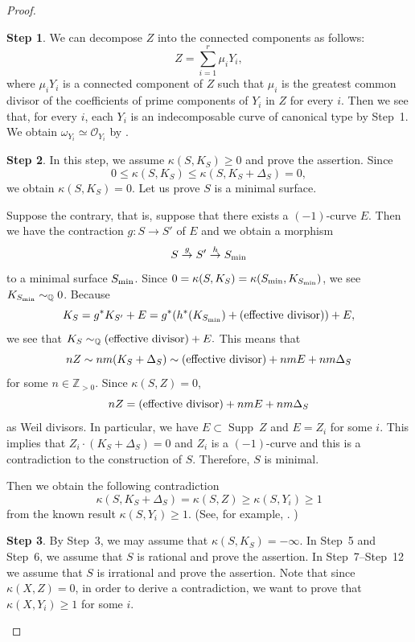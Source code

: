 \documentclass[12pt,twoside]{amsart}
\newcommand{\Supp}[0]{{\operatorname{Supp}}}
\theoremstyle{definition}
\newtheorem{step}{Step}
\begin{document}
\begin{proof}
\begin{step}
We can decompose $Z$ into the connected components as follows: 
$$
Z=\sum _{i=1}^{r} \mu_i Y_i, 
$$ 
where $\mu_i Y_i$ is a connected component of 
$Z$ such that $\mu_i$ is the greatest common divisor of 
the coefficients of prime components of $Y_i$ in $Z$ for every $i$. 
Then we see that, for every $i$, 
each $Y_i$ is an indecomposable curve of 
canonical type by Step~1. 
We obtain $\omega _{Y_i}\simeq \mathcal O_{Y_i}$ 
by \cite[Corollary~1 in P.333]{Mum}. 
\end{step}


\begin{step}
In this step, 
we assume $\kappa (S, K_S)\geq 0$ and prove the assertion. 
Since 
$$0\leq \kappa (S, K_S)\leq \kappa (S, K_S+\Delta_S)=0, $$
we obtain $\kappa (S, K_S)=0$. 
Let us prove $S$ is a minimal surface. 

Suppose the contrary, that is, 
suppose that there exists a $(-1)$-curve $E$. 
Then we have the contraction $g:S\to S'$ of $E$ and 
we obtain a morphism 
$$S\overset{g}\to S'\overset{h}\to S_{{\rm min}}$$
to a minimal surface $S_{{\rm min}}$. 
Since $0=\kappa(S, K_S)=\kappa(S_{{\rm min}}, K_{S_{{\rm min}}})$, 
we see $K_{S_{{\rm min}}}\sim_{\mathbb{Q}}0$. 
Because 
$$K_S=g^*K_{S'}+E=g^*(h^*(K_{S_{{\rm min}}})+({\rm effective\,\,divisor}))+E,$$ 
we see that 
$K_S\sim_{\mathbb{Q}} ({\rm effective\,\,divisor})+E.$
This means that 
$$nZ\sim nm(K_S+\Delta_S)\sim ({\rm effective\,\,divisor})+nmE+nm\Delta_S$$
for some $n\in\mathbb Z_{>0}.$ 
Since $\kappa(S, Z)=0$, 
$$nZ=({\rm effective\,\,divisor})+nmE+nm\Delta_S$$
as Weil divisors. 
In particular, we have $E\subset \Supp~Z$ and 
$E=Z_i$ for some $i$. 
This implies that 
$Z_i\cdot (K_S+\Delta_S)=0$ and $Z_i$ is a $(-1)$-curve and 
this is a contradiction to the construction of $S$. 
Therefore, $S$ is minimal. 

Then we obtain the following contradiction 
$$\kappa (S, K_S+\Delta_S)=\kappa (S, Z)\geq \kappa (S, Y_i) \geq 1$$ 
from the known result $\kappa (S, Y_i) \geq 1$. 
(See, for example, \cite[Theorem 7.11]{Badescu}. ) 
\end{step}

\begin{step}
By Step~3, we may assume that $\kappa (S, K_S)=-\infty$. 
In Step~5 and Step~6, 
we assume that $S$ is rational and prove the assertion. 
In Step~7--Step~12 we assume that $S$ is irrational and prove the assertion. 
Note that 
since $\kappa(X, Z)=0$, 
in order to derive a contradiction, 
we want to prove that $\kappa(X, Y_i)\geq 1$ for some $i$. 
\end{step}


\end{proof}
\end{document}
